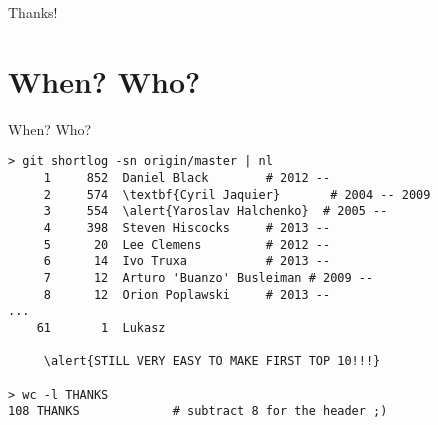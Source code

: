 \documentclass[]{beamer}
\begin{document}
\begin{frame}{}
\begin{center}
\Large Thanks!
\end{center}
%
\end{frame}

\appendix

\section{When? Who?}

\begin{frame}[fragile]{When? Who?}

\begin{Verbatim}[commandchars=\\\{\},fontsize=\small]
> git shortlog -sn origin/master | nl
     1	   852	Daniel Black        # 2012 --
     2	   574	\textbf{Cyril Jaquier}       # 2004 -- 2009
     3	   554	\alert{Yaroslav Halchenko}  # 2005 --
     4	   398	Steven Hiscocks     # 2013 --
     5	    20	Lee Clemens         # 2012 --
     6	    14	Ivo Truxa           # 2013 --
     7	    12	Arturo 'Buanzo' Busleiman # 2009 --
     8	    12	Orion Poplawski     # 2013 --
...
    61	     1	Lukasz

     \alert{STILL VERY EASY TO MAKE FIRST TOP 10!!!}

> wc -l THANKS
108 THANKS             # subtract 8 for the header ;)
\end{Verbatim}
\end{frame}
\end{document}
